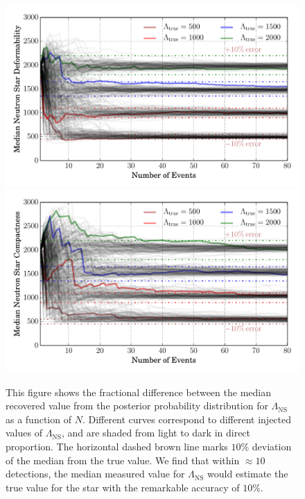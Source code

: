 \documentclass[aps,prd,amsmath,floats,floatfix, twocolumn,
superscriptaddress,nofootinbib,showpacs]{revtex4-1}
\newcommand{\lambdans}{\Lambda_\mathrm{NS}}
\begin{document}
% 
\begin{figure}
\centering
\includegraphics[trim=20 0 0 0, width=1.02\columnwidth]{plots/LambdaMedian_vs_N_AllPopulation}
\includegraphics[trim=20 0 0 0, width=1.02\columnwidth]{plots/LambdaMedian_vs_N_AstroPopulation}
\caption{This figure shows the fractional difference between the median
 recovered value from the posterior probability distribution for $\lambdans$
 as a function of $N$. Different curves correspond to different injected values
 of $\lambdans$, and are shaded from light to dark in direct proportion. 
 The horizontal dashed brown line marks $10\%$ deviation of the median from the 
 true value.
%  
We find that within $\approx 10$ detections, the median measured value for
$\lambdans$ would estimate the true value for the star with the remarkable 
accuracy of $10\%$.
}
\label{fig:TT_Lambda_vs_N_L500_2000_CI90_0_AllInOne}
\end{figure}
%
% 
\end{document}
